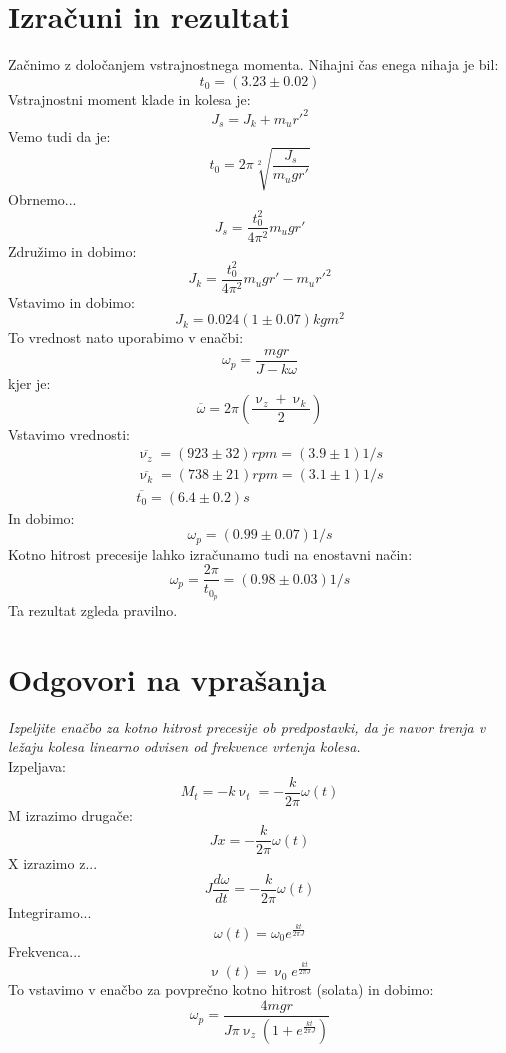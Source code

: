 \documentclass[11pt]{article}
\begin{document}
    \section{Izračuni in rezultati}
    Začnimo z določanjem vstrajnostnega momenta.
    Nihajni čas enega nihaja je bil:
    \[
        t_0 = (3.23 \pm 0.02)
    \]
    Vstrajnostni moment klade in kolesa je:
    \[
        J_s = J_k + m_u r'^2
    \]
    Vemo tudi da je:
    \[
        t_0 = 2\pi \sqrt[2]{\frac{J_s}{m_u g r'}}
    \]
    Obrnemo...
    \[
        J_s = \frac{t_0^2}{4 \pi^2} m_u g r'
    \]
    Združimo in dobimo:
    \[
        J_{k} = \frac{t_0^2}{4 \pi^2} m_u g r' - m_u r'^2
    \]
    Vstavimo in dobimo:
    \[
        J_k = 0.024(1 \pm 0.07) kg m^2
    \]
    To vrednost nato uporabimo v enačbi:
    \[
        \omega_p = \frac{m g r}{J-k \omega}
    \]
    kjer je:
    \[
        \overline{\omega}= 2 \pi (\frac{\upnu_z + \upnu_k}{2})
    \]
    Vstavimo vrednosti:
    \begin{align*}
        \overline{\upnu_z} = (923 \pm 32)rpm = (3.9 \pm 1) 1/s \\
        \overline{\upnu_k} = (738 \pm 21)rpm = (3.1 \pm 1) 1/s \\
        \overline{t_0} = (6.4 \pm 0.2)s
    \end{align*}
    In dobimo:
    \[
        \omega_p = (0.99  \pm 0.07) 1/s
    \]
    Kotno hitrost precesije lahko izračunamo tudi na enostavni način:
    \[
        \omega_p = \frac{2 \pi}{t_{0_p}} =(0.98 \pm 0.03) 1/s
    \]
    Ta rezultat zgleda pravilno.

    \section{Odgovori na vprašanja}
    \textit{Izpeljite enačbo za kotno hitrost precesije ob predpostavki, da je navor trenja v ležaju kolesa
    linearno odvisen od frekvence vrtenja kolesa.}
    \\
    Izpeljava:
    \[
        M_t = -k \upnu_t = -\frac{k}{2 \pi} \omega(t)
    \]
    M izrazimo drugače:
    \[
        J x = -\frac{k}{2 \pi} \omega(t)
    \]
    X izrazimo z...
    \[
        J \frac{d\omega}{dt} = -\frac{k}{2 \pi} \omega(t)
    \]
    Integriramo...
    \[
        \omega(t) = \omega_0 e^{\frac{k t}{2 \pi J}}
    \]
    Frekvenca...
    \[
        \upnu(t) = \upnu_0  e^{\frac{k t}{2 \pi J}}
    \]
    To vstavimo v enačbo za povprečno kotno hitrost (solata) in dobimo:
    \[
        \omega_p = \frac{4 m g r}{J \pi \upnu_z (1 + e^{\frac{k t}{2 \pi J}} )}
    \]
\end{document}

